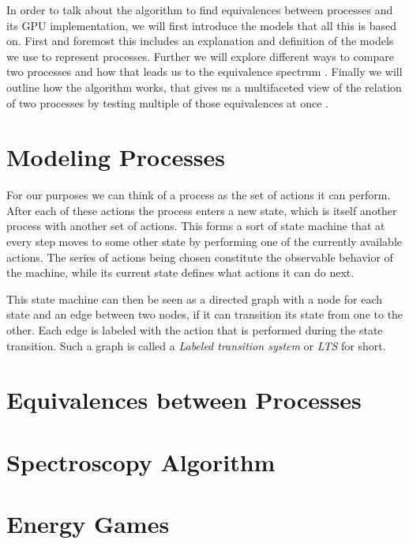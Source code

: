 In order to talk about the algorithm to find equivalences between processes
and its GPU implementation,
we will first introduce the models that all this is based on.
First and foremost this includes an explanation and definition
of the models we use to represent processes.
Further we will explore different ways to compare two processes
and how that leads us to the equivalence spectrum
\cite{glabbeek1990spectrum}.
Finally we will outline how the algorithm works,
that gives us a multifaceted view of the relation of two processes
by testing multiple of those equivalences at once
\cite{bisping2023process}.

\section{Modeling Processes}

For our purposes we can think of a process as the set of actions it can perform.
After each of these actions the process enters a new state,
which is itself another process with another set of actions.
This forms a sort of state machine that at every step
moves to some other state by performing one of the currently available actions.
The series of actions being chosen
constitute the observable behavior of the machine,
while its current state defines what actions it can do next.

This state machine can then be seen as a directed graph
with a node for each state and an edge between two nodes,
if it can transition its state from one to the other.
Each edge is labeled with the action that is performed during the state
transition.
Such a graph is called a \emph{Labeled transition system} or \emph{LTS} for
short.



\section{Equivalences between Processes}

\section{Spectroscopy Algorithm}

\section{Energy Games}
